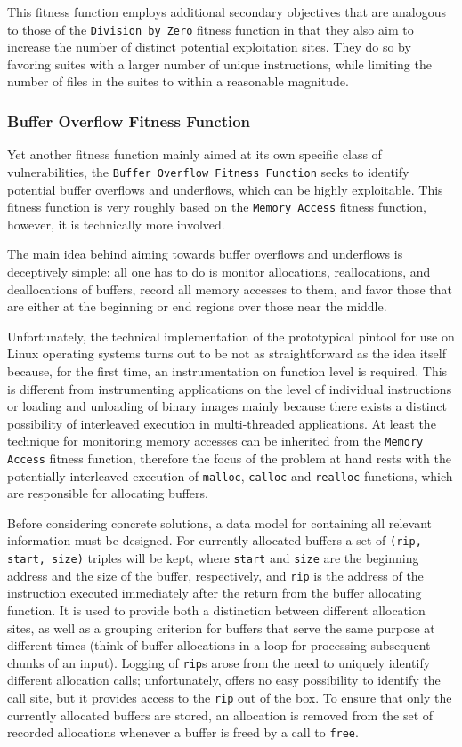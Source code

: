 This fitness function employs additional secondary objectives that are analogous to those of the
\texttt{Division by Zero} fitness function in that they also aim to increase the number of distinct
potential exploitation sites. They do so by favoring suites with a larger number of unique instructions, while
limiting the number of files in the suites to within a reasonable magnitude.

\subsubsection{Buffer Overflow Fitness Function}
Yet another fitness function mainly aimed at its own specific class of vulnerabilities, the \texttt{Buffer
Overflow Fitness Function} seeks to identify potential buffer overflows and underflows, which can be highly
exploitable. This fitness function is very roughly based on the \texttt{Memory Access} fitness function,
however, it is technically more involved. 

The main idea behind aiming towards buffer overflows and underflows is deceptively simple: all one has to do
is monitor allocations, reallocations, and deallocations of buffers, record all memory accesses to them, and
favor those that are either at the beginning or end regions over those near the middle.

Unfortunately, the technical implementation of the prototypical pintool for use on Linux operating systems
turns out to be not as straightforward as the idea itself because, for the first time, an instrumentation on
function level is required. This is different from instrumenting applications on the level of individual
instructions or loading and unloading of binary images mainly because there exists a distinct possibility of
interleaved execution in multi-threaded applications. At least the technique for monitoring memory accesses
can be inherited from the \texttt{Memory Access} fitness function, therefore the focus of the problem at hand
rests with the potentially interleaved execution of \texttt{malloc}, \texttt{calloc} and \texttt{realloc} functions,
which are responsible for allocating buffers. 

Before considering concrete solutions, a data model for containing all relevant information must be designed.
For currently allocated buffers a set of \texttt{(rip, start, size)} triples will be kept, where \texttt{start}
and \texttt{size} are the beginning address and the size of the buffer, respectively, and \texttt{rip} is the
address of the instruction executed immediately after the return from the buffer allocating function. It is
used to provide both a distinction between different allocation sites, as well as a grouping criterion for
buffers that serve the same purpose at different times (think of buffer allocations in a loop for processing
subsequent chunks of an input). Logging of \texttt{rip}s arose from the need to uniquely identify different
allocation calls; unfortunately, \pin offers no easy possibility to identify the call site, but it provides
access to the \texttt{rip} out of the box. To ensure that only the currently allocated buffers are stored, an
allocation is removed from the set of recorded allocations whenever a buffer is freed by a call to
\texttt{free}.

